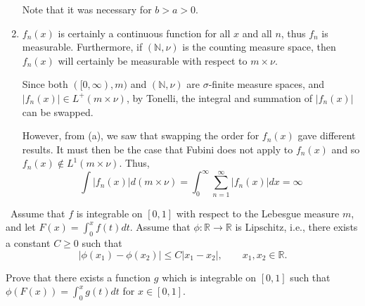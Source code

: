\documentclass[12pt]{Qual}
\begin{document}
\begin{solution}
\begin{enumerate}[label=(\alph*)]
   Note that it was necessary for $b>a>0$.
    \item $f_n(x)$ is certainly a continuous function for all $x$ and all $n$, thus $f_n$ is measurable. Furthermore, if $(\mathbb{N},\nu)$ is the counting measure space, then $f_n(x)$ will certainly be measurable with respect to $m\times\nu$.

    Since both $([0,\infty),m)$ and $(\mathbb{N},\nu)$ are $\sigma$-finite measure spaces, and $|f_n(x)|\in L^+(m\times\nu)$, by Tonelli, the integral and summation of $|f_n(x)|$ can be swapped.

    However, from (a), we saw that swapping the order for $f_n(x)$ gave different results. It must then be the case that Fubini does not apply to $f_n(x)$ and so $f_n(x)\notin L^1(m\times \nu)$. Thus, $$\int|f_n(x)|d(m\times\nu)=\int_0^\infty\sum_{n=1}^\infty|f_n(x)|dx=\infty$$
\end{enumerate}
\end{solution}
\newpage

\begin{problem} $\,$
Assume that $f$ is integrable on $[0,1]$ with respect to the Lebesgue measure $m$, and let $F(x)=\int_0^xf(t)dt.$ Assume that $\phi:\mathbb{R}\to\mathbb{R}$ is Lipschitz, i.e., there exists a constant $C\ge0$ such that $$|\phi(x_1)-\phi(x_2)|\le C|x_1-x_2|,\qquad x_1,x_2\in\mathbb{R}.$$

Prove that there exists a function $g$ which is integrable on $[0,1]$ such that $\phi(F(x))=\int_0^xg(t)dt$ for $x\in[0,1]$.
\end{problem}
\end{document}
